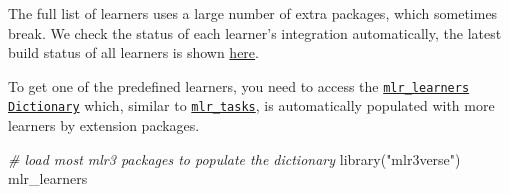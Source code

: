 \documentclass[
]{scrbook}
\newenvironment{Shaded}{\begin{snugshade}}{\end{snugshade}}
\newcommand{\CommentTok}[1]{\textcolor[rgb]{0.56,0.35,0.01}{\textit{#1}}}
\newcommand{\FunctionTok}[1]{\textcolor[rgb]{0.00,0.00,0.00}{#1}}
\newcommand{\NormalTok}[1]{#1}
\newcommand{\StringTok}[1]{\textcolor[rgb]{0.31,0.60,0.02}{#1}}
\renewenvironment{Shaded} {\begin{snugshade}\small} {\end{snugshade}}
\begin{document}
The full list of learners uses a large number of extra packages, which sometimes break.
We check the status of each learner's integration automatically, the latest build status of all learners is shown \href{https://mlr3extralearners.mlr-org.com/articles/learners/learner_status.html}{here}.

To get one of the predefined learners, you need to access the \href{https://mlr3.mlr-org.com/reference/mlr_learners.html}{\texttt{mlr\_learners}} \href{https://mlr3misc.mlr-org.com/reference/Dictionary.html}{\texttt{Dictionary}} which, similar to \href{https://mlr3.mlr-org.com/reference/mlr_tasks.html}{\texttt{mlr\_tasks}}, is automatically populated with more learners by extension packages.

\begin{Shaded}
\begin{Highlighting}[]
\CommentTok{\# load most mlr3 packages to populate the dictionary}
\FunctionTok{library}\NormalTok{(}\StringTok{"mlr3verse"}\NormalTok{)}
\NormalTok{mlr\_learners}
\end{Highlighting}
\end{Shaded}
\end{document}
